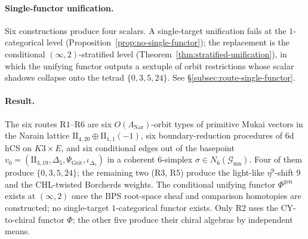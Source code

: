\documentclass[11pt]{article}
\begin{document}
\paragraph{Single-functor unification.}
Six constructions produce four scalars. A single-target unification
fails at
the $1$-categorical level (Proposition~\ref{prop:no-single-functor});
the replacement is the conditional $(\infty, 2)$-stratified level
(Theorem~\ref{thm:stratified-unification}), in which the unifying
functor outputs a sextuple of orbit restrictions whose scalar
shadows collapse onto the tetrad $\{0, 3, 5, 24\}$.
See \S\ref{subsec:route-single-functor}.

\paragraph{Result.} The six routes R$1$--R$6$ are
six $O(\Lambda_{\mathrm{Nar}})$-orbit types of primitive Mukai
vectors in the Narain lattice $\mathrm{II}_{4,20} \oplus
\mathrm{II}_{1,1}(-1)$, six boundary-reduction procedures of
6d hCS on $K3 \times E$, and six conditional edges out of the
basepoint $v_0 = (\mathrm{II}_{3,19},
\Delta_5, \Psi_{\mathrm{Grit}}, \iota_{\Delta_5})$ in a coherent
$6$-simplex $\sigma \in N_6(\mathcal G_{\mathrm{mn}})$. Four of
them produce $\{0, 3, 5, 24\}$; the remaining two (R$3$, R$5$)
produce the light-like $\eta^9$-shift $9$ and the CHL-twisted
Borcherds weights. The conditional unifying functor
$\Phi^{\mathrm{gen}}$ exists at $(\infty, 2)$ once the BPS
root-space sheaf and comparison homotopies are constructed; no
single-target $1$-categorical functor exists. Only R$2$ uses the
CY-to-chiral functor
$\Phi$; the other five produce their chiral algebras by
independent means.
\end{document}
